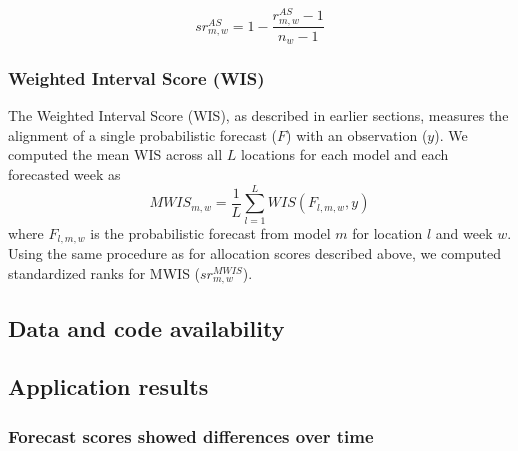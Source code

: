 \documentclass{article}\usepackage[]{graphicx}\usepackage[]{xcolor}
\begin{document}
\begin{equation}
sr_{m,w}^{AS} = 1 - \frac{r^{AS}_{m,w}-1}{n_w-1}
\end{equation}

\subsubsection{Weighted Interval Score (WIS)}

The Weighted Interval Score (WIS), as described in earlier sections, measures the alignment of a single probabilistic forecast ($F$) with an observation ($y$).
We computed the mean WIS across all $L$ locations for each model and each forecasted week as
\begin{equation}
MWIS_{m,w} = \frac{1}{L}\sum_{l=1}^L WIS(F_{l,m,w},y)
\end{equation}
where $F_{l,m,w}$ is the probabilistic forecast from model $m$ for location $l$ and week $w$.
Using the same procedure as for allocation scores described above, we computed standardized ranks for MWIS ($sr_{m,w}^{MWIS}$).

\subsection{Data and code availability}

\subsection{Application results}




\subsubsection{Forecast scores showed differences over time}
\end{document}
